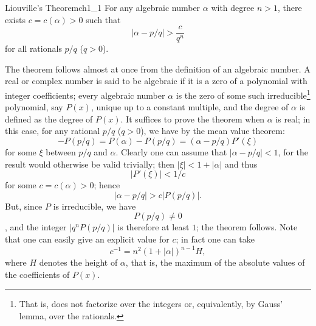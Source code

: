 \begin{mythm}{Liouville's Theorem}{ch1_1}
For any algebraic number $\alpha$ with degree $n > 1$, there exists $c = c(\alpha) > 0$ such that
\[
|\alpha - p/q| > \frac{c}{q^n}
\]
for all rationals $p/q$ ($q > 0$).
\end{mythm}

The theorem follows almost at once from the definition of an algebraic number. A real or complex number is said to be algebraic if it is a zero of a polynomial with integer coefficients; every algebraic number $\alpha$ is the zero of some such irreducible\footnote{That is, does not factorize over the integers or, equivalently, by Gauss' lemma, over the rationals.} polynomial, say $P(x)$, unique up to a constant multiple, and the degree of $\alpha$ is defined as the degree of $P(x)$. It suffices to prove the theorem when $\alpha$ is real; in this case, for any rational $p/q$ ($q > 0$), we have by the mean value theorem:
\[
-P(p/q) = P(\alpha) - P(p/q) = (\alpha - p/q) P'(\xi)
\]
for some $\xi$ between $p/q$ and $\alpha$. Clearly one can assume that $|\alpha - p/q| < 1$, for the result would otherwise be valid trivially; then  $|\xi| < 1 + |\alpha|$ and thus \[|P'(\xi)| < 1/c\] for some $c = c(\alpha) > 0$; hence
\[
|\alpha - p/q| > c |P(p/q)|.
\]
But, since $P$ is irreducible, we have \[P(p/q) \neq 0\], and the integer $|q^n P(p/q)|$ is therefore at least $1$; the theorem follows. Note that one can easily give an explicit value for $c$; in fact one can take
\[
c^{-1} = n^2(1+|\alpha|)^{n-1} H,
\]
where $H$ denotes the height of $\alpha$, that is, the maximum of the absolute values of the coefficients of $P(x)$.

